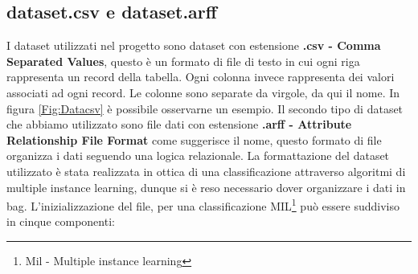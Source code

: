 \subsection{dataset.csv e dataset.arff}
\label{par:dataset}
I dataset utilizzati nel progetto sono dataset con estensione \textbf{.csv - Comma Separated Values}, questo è un formato di file di testo in cui ogni riga rappresenta un record della tabella. Ogni colonna invece rappresenta dei valori associati ad ogni record. Le colonne sono separate da virgole, da qui il nome. In figura \ref{Fig:Datacsv} è possibile osservarne un esempio. 
\vspace{1em}
\newline
Il secondo tipo di dataset che abbiamo utilizzato sono file dati con estensione \textbf{.arff - Attribute Relationship File Format} come suggerisce il nome, questo formato di file organizza i dati seguendo una logica relazionale.
La formattazione del dataset utilizzato è stata realizzata in ottica di una classificazione attraverso algoritmi di multiple instance learning, dunque si è reso necessario dover organizzare i dati in bag. L'inizializzazione del file, per una classificazione MIL\footnote{Mil - Multiple instance learning} può essere suddiviso in cinque componenti\cite{wekaDoc}:  
